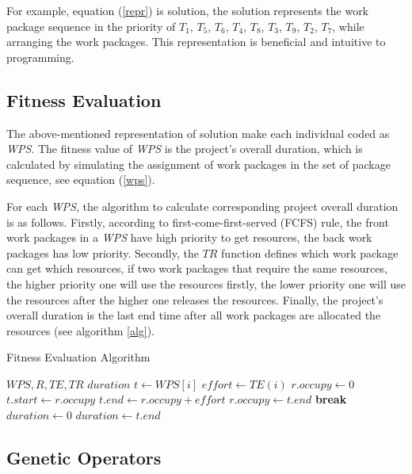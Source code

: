 For example, equation (\ref{repr}) is solution, the solution represents the work
package sequence in the priority of $T_1$, $T_5$, $T_6$, $T_4$, $T_8$, $T_3$,
$T_9$, $T_2$, $T_7$, while arranging the work packages. This representation is
beneficial and intuitive to programming.


\subsection{Fitness Evaluation}
%
The above-mentioned representation of solution make each individual coded as
\emph{WPS}. The fitness value of \emph{WPS} is the project's overall duration,
which is calculated by simulating the assignment of work packages in the set of
package sequence, see equation (\ref{wps}).

For each \emph{WPS}, the algorithm to calculate corresponding project overall
duration is as follows. Firstly, according to first-come-first-served (FCFS)
rule, the front work packages in a \emph{WPS} have high priority to get
resources, the back work packages has low priority. Secondly, the $TR$ function
defines which work package can get which resources, if two work packages that
require the same resources, the higher priority one will use the resources
firstly, the lower priority one will use the resources after the higher one
releases the resources. Finally, the project's overall duration is the last end
time after all work packages are allocated the resources (see algorithm
\ref{alg}).


\begin{algorithm}
  \caption{Fitness Evaluation Algorithm}
  \label{alg}
  \begin{algorithmic}
    \REQUIRE $WPS, R, TE, TR$
    \ENSURE $duration$
      \STATE $t \gets WPS[i]$
      \STATE $ effort \gets TE(i)$
        \STATE $r.occupy \gets 0$
      \ENDFOR 
          \STATE $t.start \gets r.occupy$
          \STATE $t.end \gets r.occupy + effort$
          \STATE $r.occupy \gets t.end$
          \STATE \textbf{break}
        \ENDIF
      \ENDFOR
    \ENDFOR
    \STATE $duration \gets 0$  
        \STATE $duration \gets t.end$
      \ENDIF
    \ENDFOR
  \end{algorithmic}
\end{algorithm}

\subsection{Genetic Operators}
%

